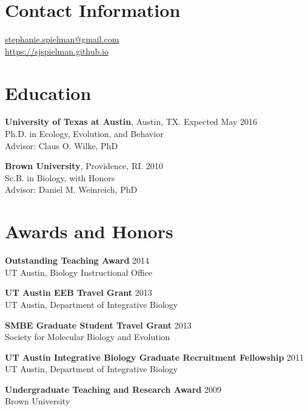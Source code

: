 \documentclass[line, margin]{res}
\begin{document}


\begin{resume}
\vspace{0.5cm}
\section{Contact Information}
	\href{mailto:stephanie.spielman@gmail.com}{stephanie.spielman@gmail.com} \\
	\url{https://sjspielman.github.io}
	
\vspace{0.75cm}
	
\section{Education}

\textbf{University of Texas at Austin}, Austin, TX. \hfill Expected May 2016 \\ Ph.D. in Ecology, Evolution, and Behavior \\ Advisor: Claus O. Wilke, PhD


\textbf{Brown University}, Providence, RI.  \hfill 2010 \\ Sc.B. in Biology, with Honors \\ Advisor: Daniel M. Weinreich, PhD

\vspace{0.75cm}

\section{Awards and Honors}

\textbf{Outstanding Teaching Award} \hfill 2014 \\ UT Austin, Biology Instructional Office

\textbf{UT Austin EEB Travel Grant} \hfill 2013 \\ UT Austin, Department of Integrative Biology

\textbf{SMBE Graduate Student Travel Grant} \hfill 2013 \\ Society for Molecular Biology and Evolution

\textbf{UT Austin Integrative Biology Graduate Recruitment Fellowship} \hfill 2011 \\ UT Austin, Department of Integrative Biology

\textbf{Undergraduate Teaching and Research Award} \hfill 2009 \\ Brown University


\end{resume}
\end{document}
